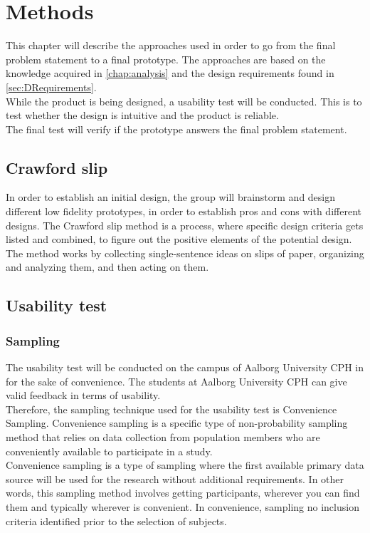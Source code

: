 \chapter{Methods}\label{chap:methods}
This chapter will describe the approaches used in order to go from the final problem statement to a final prototype. The approaches are based on the knowledge acquired in \autoref{chap:analysis} and the design requirements found in \autoref{sec:DRequirements}.\\

While the product is being designed, a usability test will be conducted. This is to test whether the design is intuitive and the product is reliable.\\

The final test will verify if the prototype answers the final problem statement.

\section{Crawford slip}\label{sec:crawfordSlip}
In order to establish an initial design, the group will brainstorm and design different low fidelity prototypes, in order to establish pros and cons with different designs. 
The Crawford slip method is a process, where specific design criteria gets listed and combined, to figure out the positive elements of the potential design\cite{crawfordSlip}.
The method works by collecting single-sentence ideas on slips of paper, organizing and analyzing them, and then acting on them\cite{crawfordSlip}.

\section{Usability test}

\subsection{Sampling}
The usability test will be conducted on the campus of Aalborg University CPH in for the sake of convenience. The students at Aalborg University CPH can give valid feedback in terms of usability.\\

Therefore, the sampling technique used for the usability test is Convenience Sampling. Convenience sampling is a specific type of non-probability sampling method that relies on data collection from population members who are conveniently available to participate in a study\cite{convSamp}.\\
Convenience sampling is a type of sampling where the first available primary data source will be used for the research without additional requirements. In other words, this sampling method involves getting participants, wherever you can find them and typically wherever is convenient\cite{convSamp}. In convenience, sampling no inclusion criteria identified prior to the selection of subjects\cite{convSamp}.\\

